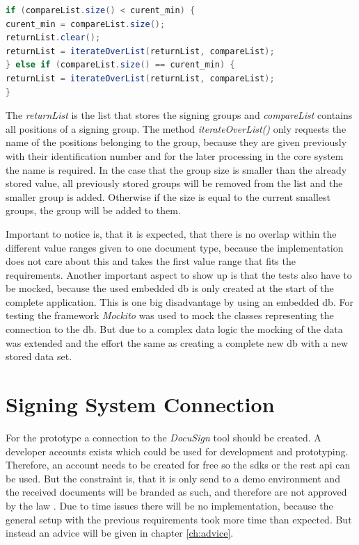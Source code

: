 \begin{lstlisting}[language=Java,caption={Store signing group based on its size},captionpos=b]
if (compareList.size() < curent_min) {
curent_min = compareList.size();
returnList.clear();
returnList = iterateOverList(returnList, compareList);
} else if (compareList.size() == curent_min) {
returnList = iterateOverList(returnList, compareList);
}
\end{lstlisting}

The \textit{returnList} is the list that stores the signing groups and \textit{compareList} contains all positions of a signing group. The method \textit{iterateOverList()} only requests the name of the positions belonging to the group, because they are given previously with their identification number and for the later processing in the core system the name is required. \newline
In the case that the group size is smaller than the already stored value, all previously stored groups will be removed from the list and the smaller group is added. Otherwise if the size is equal to the current smallest groups, the group will be added to them.

Important to notice is, that it is expected, that there is no overlap within the different value ranges given to one document type, because the implementation does not care about this and takes the first value range that fits the requirements. \newline
Another important aspect to show up is that the tests also have to be mocked, because the used embedded \gls{db} is only created at the start of the complete application. This is one big disadvantage by using an embedded \gls{db}. For testing the framework \textit{Mockito} was used to mock the classes representing the connection to the \gls{db}. But due to a complex data logic the mocking of the data was extended and the effort the same as creating a complete new \gls{db} with a new stored data set.
 

\section{Signing System Connection}
For the prototype a connection to the \textit{DocuSign} tool should be created. A developer accounts exists which could be used for development and prototyping. Therefore, an account needs to be created for free so the \glspl{sdk} or the \gls{rest} \gls{api} can be used. But the constraint is, that it is only send to a demo environment and the received documents will be branded as such, and therefore are not approved by the law \parencite{docusign2018developer}. \newline
Due to time issues there will be no implementation, because the general setup with the previous requirements took more time than expected. But instead an advice will be given in chapter \ref{ch:advice}. 